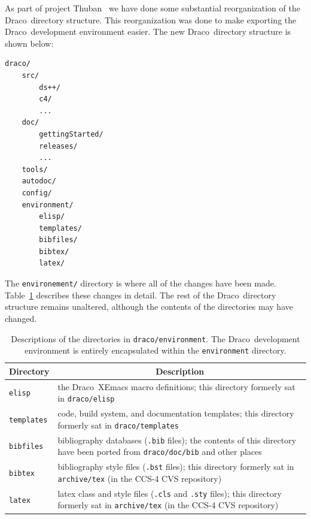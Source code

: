 \documentclass[note]{ResearchNote}
\newcommand{\draco}{Draco}
\newcommand{\tableText}[1]{{\raggedright #1}}
\begin{document}
As part of project Thuban~\cite{ccs-4:04-21} we have done some
substantial reorganization of the \draco\ directory structure.  This
reorganization was done to make exporting the \draco\ development
environment easier.  The new \draco\ directory structure is shown below: 
\begin{lstlisting}[basicstyle=\footnotesize, xleftmargin=2.0in, 
  xrightmargin=2.0in]
draco/
    src/
        ds++/
        c4/
        ...
    doc/
        gettingStarted/
        releases/
        ...
    tools/
    autodoc/
    config/
    environment/
        elisp/
        templates/
        bibfiles/
        bibtex/
        latex/
\end{lstlisting}
The \texttt{environement/} directory is where all of the changes have
been made.  Table~\ref{tab:envdir} describes these changes in detail.
The rest of the \draco\ directory structure remains unaltered,
although the contents of the directories may have changed.
\begin{table}
  \caption{
    Descriptions of the directories in \texttt{draco/environment}.
    The \draco\ development environment is entirely encapsulated
    within the \texttt{environment} directory.
  }
  \label{tab:envdir}
  \begin{center}
    \begin{tabular}{lp{3in}}\hline\hline
      \multicolumn{1}{c}{Directory} & 
      \multicolumn{1}{c}{Description} \\ \hline
      
      \texttt{elisp} & \tableText{the \draco\ XEmacs macro
        definitions; this directory formerly sat in
        \texttt{draco/elisp}} \\ 
      
      \texttt{templates} & \tableText{code, build system, and
        documentation templates; this directory formerly sat in
        \texttt{draco/templates}} \\

      \texttt{bibfiles} & \tableText{bibliography databases
        (\texttt{.bib} files); the contents of this directory have
        been ported from \texttt{draco/doc/bib} and other places} \\ 
      
      \texttt{bibtex} & \tableText{bibliography style files
        (\texttt{.bst} files); this directory formerly sat in
        \texttt{archive/tex} (in the CCS-4 CVS repository)} \\
      
      \texttt{latex} & \tableText{latex class and style files
        (\texttt{.cls} and \texttt{.sty} files); this directory
        formerly sat in \texttt{archive/tex} (in the CCS-4 CVS
        repository)} \\ 

      \hline\hline
    \end{tabular}
  \end{center}
\end{table}
\end{document}
